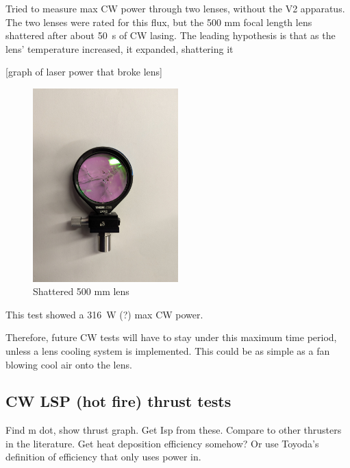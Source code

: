             Tried to measure max CW power through two lenses, without the V2 apparatus. The two lenses were rated for this flux, but the 500 mm focal length lens shattered after about \qty{50}{s} of CW lasing. The leading hypothesis is that as the lens' temperature increased, it expanded, shattering it

            [graph of laser power that broke lens]

            \begin{figure}[!ht]
                \centering
                \includegraphics[width=0.5\textwidth]{assets/4 experiments/Shattered 500 mm lens.jpg}
                \caption{Shattered 500 mm lens}
            \end{figure}

            This test showed a \qty{316}{W} (?) max CW power.

            Therefore, future CW tests will have to stay under this maximum time period, unless a lens cooling system is implemented. This could be as simple as a fan blowing cool air onto the lens.


        \subsection{CW LSP (hot fire) thrust tests}

            Find m dot, show thrust graph. Get Isp from these. Compare to other thrusters in the literature. Get heat deposition efficiency somehow? Or use Toyoda's definition of efficiency that only uses power in.
 

            

        



